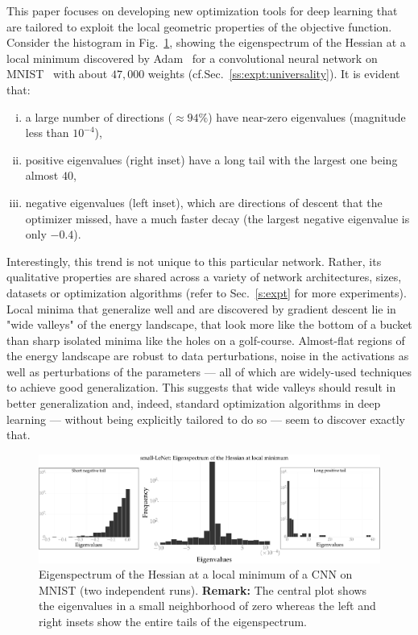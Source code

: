 \documentclass[10pt]{article}
\begin{document}
This paper focuses on developing new optimization tools for deep learning that are tailored to exploit the local geometric properties of the objective function. Consider the histogram in Fig.~\ref{fig:lenet_hessian}, showing the eigenspectrum of the Hessian at a local minimum discovered by Adam~\citep{kingma2014adam} for a convolutional neural network on MNIST~\citep{lecun1998gradient} with about $47,000$ weights (cf.\@ Sec.~\ref{ss:expt:universality}). It is evident that:
\begin{enumerate}[(i)]
\item a large number of directions ($\approx 94\%$) have near-zero eigenvalues (magnitude less than $10^{-4}$),
\item positive eigenvalues (right inset) have a long tail with the largest one being almost $40$,
\item negative eigenvalues (left inset), which are directions of descent that the optimizer missed, have a much faster decay (the largest negative eigenvalue is only $-0.4$).
\end{enumerate}
Interestingly, this trend is not unique to this particular network. Rather, its qualitative properties are shared across a variety of network architectures, sizes, datasets or optimization algorithms (refer to Sec.~\ref{s:expt} for more experiments).  Local minima that generalize well and are discovered by gradient descent lie in "wide valleys" of the energy landscape, that look more like the bottom of a bucket than sharp isolated minima like the holes on a golf-course.
Almost-flat regions of the energy landscape are robust to data perturbations, noise in the activations as well as perturbations of the parameters --- all of which are widely-used techniques to achieve good generalization. This suggests that wide valleys should result in better generalization and, indeed, standard optimization algorithms in deep learning --- without being explicitly tailored to do so --- seem to discover exactly that.

\begin{figure}[!tbh]
\vspace*{-0.1in}
\centering
\includegraphics[width=\textwidth]{lenet_hessian.pdf}
\caption{\small Eigenspectrum of the Hessian at a local minimum of a CNN on MNIST (two independent runs). \textbf{Remark:} The central plot shows the eigenvalues in a small neighborhood of zero whereas the left and right insets show the entire tails of the eigenspectrum.}
\label{fig:lenet_hessian}
\end{figure}
\end{document}
